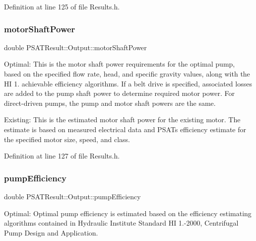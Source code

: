 Definition at line 125 of file Results.\+h.

\mbox{\label{struct_p_s_a_t_result_1_1_output_a813a97afcb5ea5465d8b733eaa4f834c}} 
\subsubsection{\texorpdfstring{motor\+Shaft\+Power}{motorShaftPower}}
{\footnotesize\ttfamily double P\+S\+A\+T\+Result\+::\+Output\+::motor\+Shaft\+Power}



Optimal\+: This is the motor shaft power requirements for the optimal pump, based on the specified flow rate, head, and specific gravity values, along with the HI 1. achievable efficiency algorithms. If a belt drive is specified, associated losses are added to the pump shaft power to determine required motor power. For direct-\/driven pumps, the pump and motor shaft powers are the same. 

Existing\+: This is the estimated motor shaft power for the existing motor. The estimate is based on measured electrical data and P\+S\+AT\textquotesingle{}s efficiency estimate for the specified motor size, speed, and class. 

Definition at line 127 of file Results.\+h.

\mbox{\label{struct_p_s_a_t_result_1_1_output_ab8ba6270cd9f0da55dfbb4fdb8d5b452}} 
\subsubsection{\texorpdfstring{pump\+Efficiency}{pumpEfficiency}}
{\footnotesize\ttfamily double P\+S\+A\+T\+Result\+::\+Output\+::pump\+Efficiency}



Optimal\+: Optimal pump efficiency is estimated based on the efficiency estimating algorithms contained in Hydraulic Institute Standard HI 1.-\/2000, Centrifugal Pump Design and Application. 

